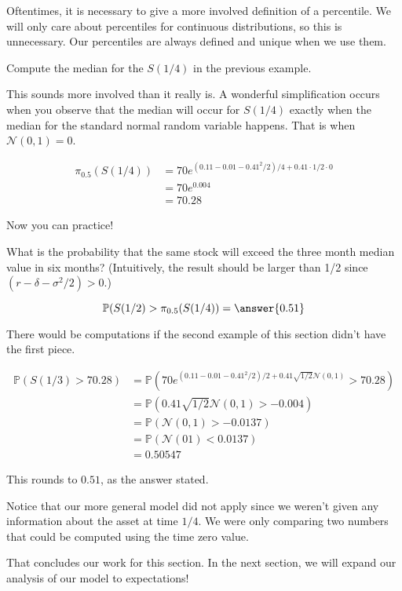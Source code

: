 \documentclass{ximera}
\begin{document}
Oftentimes, it is necessary to give a more involved definition of a percentile. We will only care about percentiles for continuous distributions, so this is unnecessary. Our percentiles are always defined and unique when we use them.

\begin{example}
Compute the median for the $S(1/4)$ in the previous example.
\end{example}

\begin{solution}
This sounds more involved than it really is. A wonderful simplification occurs when you observe that the median will occur for $S(1/4)$ exactly when the median for the standard normal random variable happens. That is when $\mathcal{N}(0,1)=0$. 

	\begin{align*}
	\pi_{0.5}(S(1/4)) 	&=70e^{(0.11-0.01-0.41^2/2)/4+0.41\cdot 1/2\cdot 0}\\
				&=70e^{0.004}\\
				&=70.28
	\end{align*}
\end{solution}

Now you can practice!

\begin{question}
What is the probability that the same stock will exceed the three month median value in six months? (Intuitively, the result should be larger than 1/2 since $(r-\delta-\sigma^2/2)>0$.)

\begin{equation*}
\mathbb{P}(S(1/2)>\pi_{0.5}(S(1/4))=\answer{0.51}
\end{equation*}
\end{question}

\begin{solution}
There would be computations if the second example of this section didn't have the first piece.

	\begin{align*}
	\mathbb{P}(S(1/3)>70.28) 	&=\mathbb{P}(70e^{(0.11-0.01-0.41^2/2)/2+0.41\sqrt{1/2}\mathcal{N}(0,1)}>70.28)\\
						&=\mathbb{P}(0.41\sqrt{1/2}\mathcal{N}(0,1)>-0.004)\\
						&=\mathbb{P}(\mathcal{N}(0,1)>-0.0137)\\
						&=\mathbb{P}(\mathcal{N}(01)<0.0137)\\
						&=0.50547
	\end{align*}

This rounds to $0.51$, as the answer stated.
\end{solution}

Notice that our more general model did not apply since we weren't given any information about the asset at time $1/4$. We were only comparing two numbers that could be computed using the time zero value. 

That concludes our work for this section. In the next section, we will expand our analysis of our model to expectations!
\end{document}
